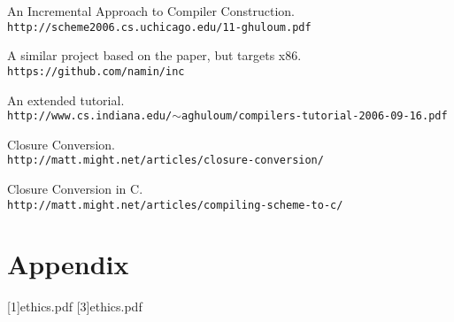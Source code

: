 \documentclass{article}
\begin{document}
\begin{thebibliography}{5}

An Incremental Approach to Compiler Construction.
\\\texttt{http://scheme2006.cs.uchicago.edu/11-ghuloum.pdf}

A similar project based on the paper, but targets x86.
\\\texttt{https://github.com/namin/inc}

An extended tutorial.
\\\texttt{http://www.cs.indiana.edu/$\sim$aghuloum/compilers-tutorial-2006-09-16.pdf}

Closure Conversion.
\\\texttt{http://matt.might.net/articles/closure-conversion/}

Closure Conversion in C.
\\\texttt{http://matt.might.net/articles/compiling-scheme-to-c/}

\newpage
\appendix
\chapter{Appendix}

[1]{ethics.pdf}
[3]{ethics.pdf}

\end{thebibliography}  
\end{document}
